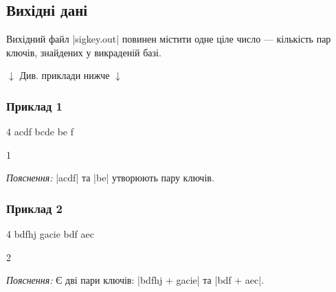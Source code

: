 \documentclass[12pt,a4paper]{article}
\begin{document}
\subsection*{Вихідні дані}

Вихідний файл |sigkey.out| повинен містити одне ціле число --- кількість пар ключів, знайдених у викраденій базі.


\begin{pagebottomtext}
$\downarrow$ Див. приклади нижче $\downarrow$
\end{pagebottomtext}


\pagebreak


\subsubsection*{Приклад 1}

\textbf{}

\begin{codeblock}
4
acdf
bcde
be
f
\end{codeblock}

\textbf{}

\begin{codeblock}
1
\end{codeblock}
\emph{Пояснення:} |acdf| та |be| утворюють пару ключів.


\subsubsection*{Приклад 2}

\textbf{}

\begin{codeblock}
4
bdfhj
gacie
bdf
aec
\end{codeblock}

\textbf{}

\begin{codeblock}
2
\end{codeblock}
\emph{Пояснення:} Є дві пари ключів: |bdfhj + gacie| та |bdf + aec|.
\end{document}
